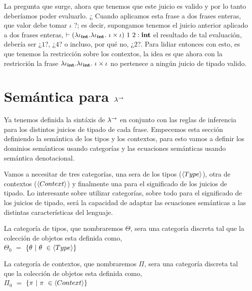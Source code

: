 La pregunta que surge, ahora que tenemos que este juicio es valido y por lo tanto
deber\'iamos poder evaluarlo. ¿ Cuando aplicamos esta frase a dos frases enteras, 
que valor debe tomar $\iota$ ?; es decir, supongamos tenemos el juicio anterior
aplicado a dos frases enteras, 
$\vdash 
	(\lambda \iota_{\textbf{int}} . \lambda \iota_{\textbf{int}} . \ \iota \times \iota) \ 1 \ 2 : \textbf{int}$
el resultado de tal evaluaci\'on, deber\'ia ser ¿$1$?, ¿$4$? o incluso, por qué no, ¿$2$?.
Para lidiar entonces con esto, es que tenemos la restricci\'on sobre los contextos, 
la idea es que ahora
con la restricci\'on la frase $\clambda{\iota}{\intt}{\clambda{\iota}{\intt} \ \iota \times \iota}$
no pertenece a ning\'un juicio de tipado valido.

\section{Sem\'antica para $\lambda^{\rightarrow}$}

Ya tenemos definida la sint\'axis de $\lambda^{\rightarrow}$ en conjunto con las reglas
de inferencia para los distintos juicios de tipado de cada frase. Empecemos
esta secci\'on definiendo la sem\'antica de los tipos y los contextos, para esto vamos a
definir los dominios sem\'anticos usando categor\'ias y las ecuaciones
sem\'anticas usando sem\'antica denotacional. 

Vamos a necesitar de tres categor\'ias, una sera de los tipos ($\langle Type \rangle$),
otra de contextos ($\langle Context \rangle$) y finalmente una para el significado 
de los juicios de tipado. Lo interesante sobre utilizar categor\'ias, sobre
todo para el significado de los juicios de tipado, ser\'a la capacidad de
adaptar las ecuaciones sem\'anticas a las distintas caracter\'isticas del lenguaje.

\begin{definition}\label{lambdaa:typescategory}
La categor\'ia de tipos, que nombraremos $\Theta$, sera una categor\'ia discreta tal que 
la colecci\'on de objetos esta definida como,\\

$\Theta_0$ $=$ $\{\theta \ | \ \theta \ \in \langle Type \rangle \}$

\end{definition}

\begin{definition}\label{lambdaa:contextcategory}
La categor\'ia de contextos, que nombraremos $\Pi$, sera una categor\'ia discreta tal que 
la colecci\'on de objetos esta definida como,\\

$\Pi_0$ $=$ $\{\pi \ | \ \pi \ \in \langle Context \rangle \}$

\end{definition}

